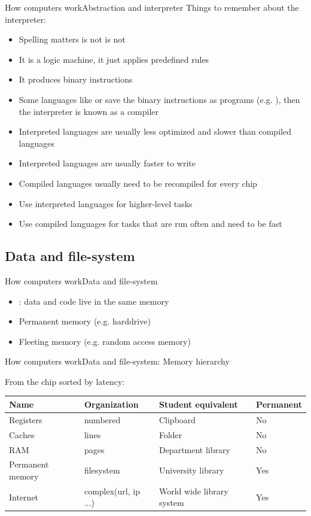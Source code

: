 \documentclass[aspectratio=169]{beamer}
\begin{document}
\begin{frame}{How computers work}{Abstraction and interpreter}
Things to remember about the interpreter:
\begin{itemize}
	\item Spelling matters  is not  is not 
	\item It is a logic machine, it just applies predefined rules
	\item It produces binary instructions
	\item Some languages like  or  save the binary instructions as programs (e.g. ),
		then the interpreter is known as a compiler
	\item Interpreted languages are usually less optimized and slower than compiled languages
	\item Interpreted languages are usually faster to write
	\item Compiled languages usually need to be recompiled for every chip
	\item Use interpreted languages for higher-level tasks
	\item Use compiled languages for tasks that are run often and need to be fast
\end{itemize}
\end{frame}

\subsection{Data and file-system}
\begin{frame}{How computers work}{Data and file-system}
\begin{itemize}
	\item {}: data and code live in the same memory
	\item Permanent memory (e.g. harddrive)
	\item Fleeting memory (e.g. random access memory)
\end{itemize}
\end{frame}

\begin{frame}{How computers work}{Data and file-system: Memory hierarchy}

From the chip sorted by latency:

\vspace{2em}

\begin{tabular}{llll}
	\toprule
	Name & Organization & Student equivalent & Permanent \\
	\midrule
	Registers & numbered & Clipboard & No\\
	Caches & lines & Folder & No \\
	RAM & pages & Department library & No \\
	Permanent memory & filesystem & University library & Yes \\
	Internet & complex(url, ip ...) & World wide library system & Yes \\
	\bottomrule
\end{tabular}
\end{frame}
\end{document}
